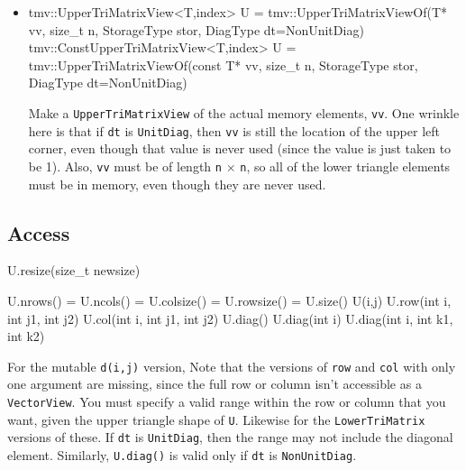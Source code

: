 \documentclass[twoside,letterpaper,11pt]{article}
\renewcommand{\tt}[1]{{\lstinline {#1}}}
\begin{document}
\begin{itemize}
\item
\begin{tmvcode}
tmv::UpperTriMatrixView<T,index> U = 
      tmv::UpperTriMatrixViewOf(T* vv, size_t n, 
      StorageType stor, DiagType dt=NonUnitDiag)
tmv::ConstUpperTriMatrixView<T,index> U = 
      tmv::UpperTriMatrixViewOf(const T* vv, size_t n, 
      StorageType stor, DiagType dt=NonUnitDiag)
\end{tmvcode}
Make a \tt{UpperTriMatrixView} of the actual memory elements, \tt{vv}.
One wrinkle here is that if \tt{dt} is \tt{UnitDiag}, then 
\tt{vv} is still the location of the
upper left corner, even though that value is never used 
(since the value is just taken to
be 1).  Also, \tt{vv} must be of length \tt{n} $\times$ \tt{n},
so all of the lower triangle
elements must be in memory, even though they are never used.

\end{itemize}

\subsection{Access}
\label{TriMatrix_Access}

\begin{tmvcode}
U.resize(size_t newsize)
\end{tmvcode}

\begin{tmvcode}
U.nrows() = U.ncols() = U.colsize() = U.rowsize() = U.size()
U(i,j)
U.row(int i, int j1, int j2)
U.col(int i, int j1, int j2)
U.diag()
U.diag(int i)
U.diag(int i, int k1, int k2)
\end{tmvcode}
For the mutable \tt{d(i,j)} version, 
Note that the versions of \tt{row} and \tt{col} with only one argument are
missing, since the full row or column isn't accessible as a \tt{VectorView}.
You must specify a valid range within the row or column that you want, 
given the upper triangle shape of \tt{U}.  Likewise for the \tt{LowerTriMatrix}
versions of these.
If \tt{dt} is \tt{UnitDiag}, then the range may not include the diagonal element.
Similarly, \tt{U.diag()} is valid only if \tt{dt} is \tt{NonUnitDiag}.
\end{document}
